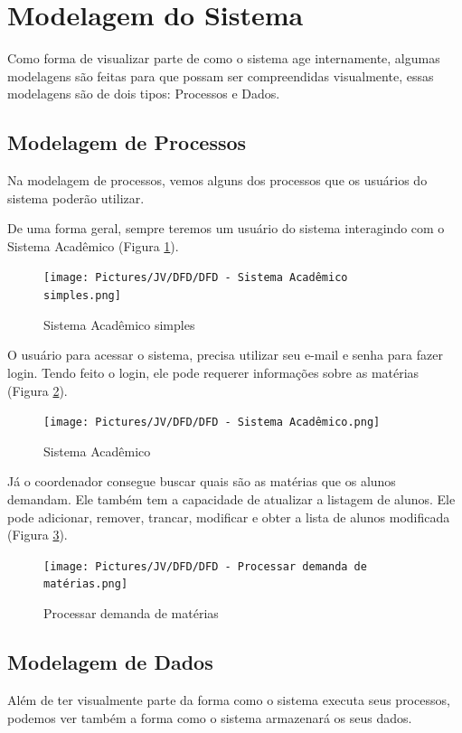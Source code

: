     \section{Modelagem do Sistema}
        Como forma de visualizar parte de como o sistema age internamente, algumas modelagens são feitas para que possam ser compreendidas visualmente, essas modelagens são de dois tipos: Processos e Dados.
        
        \subsection{Modelagem de Processos}
            Na modelagem de processos, vemos alguns dos processos que os usuários do sistema poderão utilizar.
            
            De uma forma geral, sempre teremos um usuário do sistema interagindo com o Sistema Acadêmico (Figura \ref{DFD1}).
            \begin{figure}[htbp]\centering
                \caption{Sistema Acadêmico simples}
                \texttt{[image: Pictures/JV/DFD/DFD - Sistema Acadêmico simples.png]}
                \label{DFD1}
            \end{figure}    %
            
            O usuário para acessar o sistema, precisa utilizar seu e-mail e senha para fazer login. Tendo feito o login, ele pode requerer informações sobre as matérias (Figura \ref{DFD2}).
            \begin{figure}[htbp]\centering
                \caption{Sistema Acadêmico}
                \texttt{[image: Pictures/JV/DFD/DFD - Sistema Acadêmico.png]}
                \label{DFD2}
            \end{figure}    %
            
            Já o coordenador consegue buscar quais são as matérias que os alunos demandam. Ele também tem a capacidade de atualizar a listagem de alunos. Ele pode adicionar, remover, trancar, modificar e obter a lista de alunos modificada (Figura \ref{DFD3}).
            \begin{figure}[htbp]\centering
                \caption{Processar demanda de matérias}
                \texttt{[image: Pictures/JV/DFD/DFD - Processar demanda de matérias.png]}
                \label{DFD3}
            \end{figure}    %
        
        \subsection{Modelagem de Dados}
            Além de ter visualmente parte da forma como o sistema executa seus processos, podemos ver também a forma como o sistema armazenará os seus dados.
            
